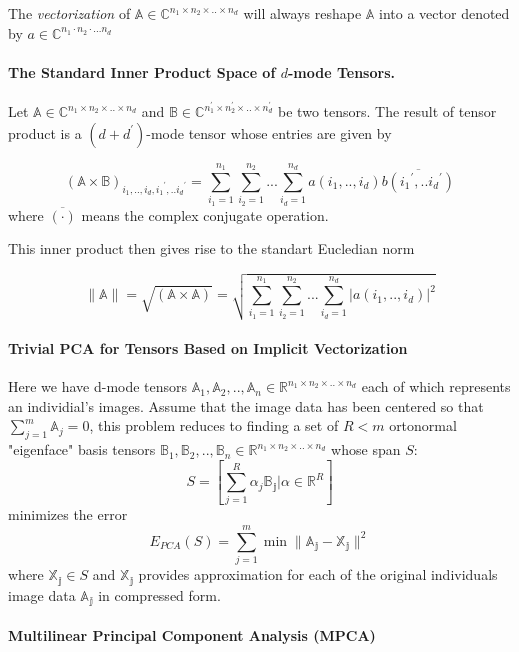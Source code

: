 \documentclass[a4paper,12pt]{article}
\begin{document}
The \textit{vectorization} of $\mathbb{A} \in \mathbb{C}^{n_1 \times n_2 \times .. \times n_d}$ will always reshape $\mathbb{A}$ into a vector denoted by $a \in \mathbb{C}^{n_1 \cdot n_2 \cdot...n_d}$

\paragraph{The Standard Inner Product Space of $d$-mode Tensors.}

Let $\mathbb{A} \in \mathbb{C}^{n_1 \times n_2 \times .. \times n_d}$ and $\mathbb{B} \in \mathbb{C}^{n_1^{'} \times n_2^{'} \times .. \times n_d^{'}}$ be two tensors. The result of tensor product is a $(d + d^{'})$-mode tensor whose entries are given by 

$${(\mathbb{A} \times \mathbb{B})}_{i_1, .., i_d, {i_1}^{'},.. {i_d}^{'}} = \sum_{i_1 = 1}^{n_1} \sum_{i_2 = 1}^{n_2} ... \sum_{i_d = 1}^{n_d} a(i_1, .., i_d) \overline{b({i_1}^{'},.. {i_d}^{'})}$$
where $\overline{(\cdot)}$ means the complex conjugate operation.

This inner product then gives rise to the standart Eucledian norm

$$\|\mathbb{A} \| = \sqrt{(\mathbb{A} \times \mathbb{A})} = \sqrt{\sum_{i_1 = 1}^{n_1} \sum_{i_2 = 1}^{n_2} ... \sum_{i_d = 1}^{n_d}|a(i_1, .., i_d)|^2}$$
\paragraph{Trivial PCA for Tensors Based on Implicit Vectorization}

Here we have d-mode tensors $\mathbb{A}_1,\mathbb{A}_2, .., \mathbb{A}_n \in \mathbb{R}^{n_1 \times n_2 \times .. \times n_d}$ each of which represents an individial's images. Assume that the image data has been centered so that $\sum_{j = 1}^m \mathbb{A}_j = 0$, this problem reduces to finding a set of $R < m$ ortonormal "eigenface" basis tensors $\mathbb{B}_1,\mathbb{B}_2, .., \mathbb{B}_n \in \mathbb{R}^{n_1 \times n_2 \times .. \times n_d}$ whose span $S$:
$$S = \left[ \sum_{j = 1}^R \alpha_j \mathbb{B_j} | \alpha \in \mathbb{R}^R \right]$$
minimizes the error
$$E_{PCA} (S) = \sum_{j=1}^m \min \| \mathbb{A_j} - \mathbb{X_j} \|^2$$
where $\mathbb{X_j} \in S$ and $\mathbb{X_j}$ provides approximation for each of the original individuals image data $\mathbb{A_j}$ in compressed form. 

\paragraph{Multilinear Principal Component Analysis (MPCA)}
\end{document}
